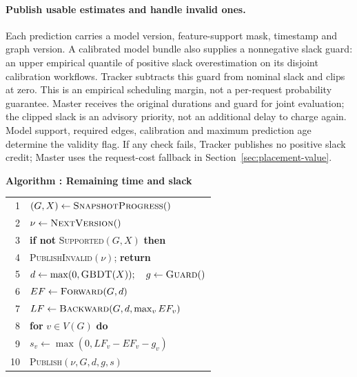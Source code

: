 \paragraph{Publish usable estimates and handle invalid ones.}
Each prediction carries a model version, feature-support mask, timestamp
and graph version. A calibrated model bundle also supplies a nonnegative
slack guard: an upper empirical quantile of positive slack overestimation
on its disjoint calibration workflows. Tracker subtracts this guard from
nominal slack and clips at zero. This is an empirical scheduling margin,
not a per-request probability guarantee. Master receives the original
durations and guard for joint evaluation; the clipped slack is an advisory
priority, not an additional delay to charge again. Model support, required edges,
calibration and maximum prediction age determine the validity flag.
If any check fails, Tracker publishes no positive slack credit; Master
uses the request-cost fallback in Section~\ref{sec:placement-value}.

\par\medskip\noindent\begin{minipage}{\columnwidth}
\raggedright
 \label{alg:workflow-tracker}
 \textbf{Algorithm \thedesignalgorithm: Remaining time and slack}
 \par\smallskip
 \begin{tabularx}{\columnwidth}{@{}r@{\quad}X@{}}
 \toprule
 1 & $(G,X)\gets\textsc{SnapshotProgress}()$ \\
 2 & $\nu\gets\textsc{NextVersion}()$ \\
 3 & \textbf{if not} \textsc{Supported}$(G,X)$ \textbf{then} \\
 4 & \quad \textsc{PublishInvalid}$(\nu)$; \textbf{return} \\
 5 & $d\gets\max(0,\textsc{GBDT}(X));\quad g\gets\textsc{Guard}()$ \\
 6 & $EF\gets\textsc{Forward}(G,d)$ \\
 7 & $LF\gets\textsc{Backward}(G,d,\max_v EF_v)$ \\
 8 & \textbf{for} $v\in V(G)$ \textbf{do} \\
 9 & \quad $s_v\gets\max(0,LF_v-EF_v-g_v)$ \\
 10 & \textsc{Publish}$(\nu,G,d,g,s)$ \\
 \bottomrule
 \end{tabularx}
\end{minipage}\par\medskip

